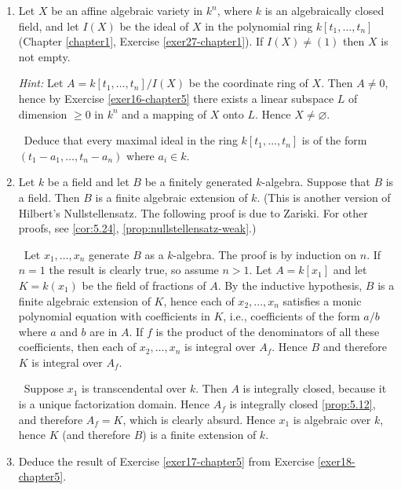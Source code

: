 \begin{enumerate}
    \emph{Nullstellensatz (weak form).}

    \item \label{exer17-chapter5} Let $X$ be an affine algebraic variety in $k^n$, where $k$ is an algebraically closed field, and let $I(X)$ be the ideal of $X$ in the polynomial ring $k[t_1, \ldots, t_n]$ (Chapter \ref{chapter1}, Exercise \ref{exer27-chapter1}). If $I(X) \neq (1)$ then $X$ is not empty.

    \textit{Hint:} Let $A = k[t_1, \ldots, t_n]/I(X)$ be the coordinate ring of $X$. Then $A \neq 0$, hence by Exercise \ref{exer16-chapter5} there exists a linear subspace $L$ of dimension $\geq 0$ in $k^n$ and a mapping of $X$ onto $L$. Hence $X \neq \varnothing$.

    \quad\, Deduce that every maximal ideal in the ring $k[t_1, \ldots, t_n]$ is of the form $(t_1 - a_1, \ldots, t_n - a_n)$ where $a_i \in k$.

    \item \label{exer18-chapter5}Let $k$ be a field and let $B$ be a finitely generated $k$-algebra. Suppose that $B$ is a field. Then $B$ is a finite algebraic extension of $k$. (This is another version of Hilbert's Nullstellensatz. The following proof is due to Zariski. For other proofs, see \eqref{cor:5.24}, \eqref{prop:nullstellensatz-weak}.)
    
    \quad\, Let $x_1, \ldots, x_n$ generate $B$ as a $k$-algebra. The proof is by induction on $n$. If $n = 1$ the result is clearly true, so assume $n > 1$. Let $A = k[x_1]$ and let $K = k(x_1)$ be the field of fractions of $A$. By the inductive hypothesis, $B$ is a finite algebraic extension of $K$, hence each of $x_2, \ldots, x_n$ satisfies a monic polynomial equation with coefficients in $K$, i.e., coefficients of the form $a/b$ where $a$ and $b$ are in $A$. If $f$ is the product of the denominators of all these coefficients, then each of $x_2, \ldots, x_n$ is integral over $A_f$. Hence $B$ and therefore $K$ is integral over $A_f$.

    \quad\, Suppose $x_1$ is transcendental over $k$. Then $A$ is integrally closed, because it is a unique factorization domain. Hence $A_f$ is integrally closed \eqref{prop:5.12}, and therefore $A_f = K$, which is clearly absurd. Hence $x_1$ is algebraic over $k$, hence $K$ (and therefore $B$) is a finite extension of $k$.

    \item \label{exer19-chapter5}Deduce the result of Exercise \ref{exer17-chapter5} from Exercise \ref{exer18-chapter5}.


\end{enumerate}
